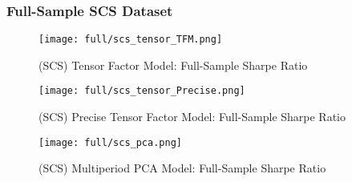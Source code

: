 \subsubsection{Full-Sample SCS Dataset}

\begin{figure}[H]
    \centering
    \texttt{[image: full/scs\_tensor\_TFM.png]}
    \caption{(SCS) Tensor Factor Model: Full-Sample Sharpe Ratio}
    \label{fig:scs-primary-tfm}
\end{figure}

\begin{figure}[H]
    \centering
    \texttt{[image: full/scs\_tensor\_Precise.png]}
    \caption{(SCS) Precise Tensor Factor Model: Full-Sample Sharpe Ratio}
    \label{fig:scs-primary-precise}
\end{figure}


\begin{figure}[H]
    \centering
    \texttt{[image: full/scs\_pca.png]}
    \caption{(SCS) Multiperiod PCA Model: Full-Sample Sharpe Ratio}
    \label{fig:scs-primary-pca}
\end{figure}
